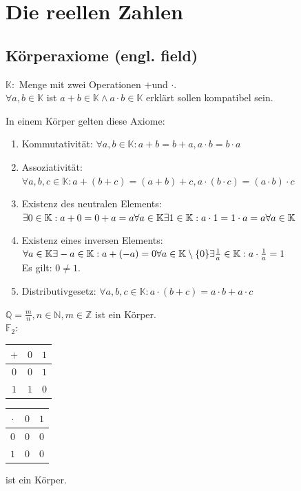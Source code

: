 \documentclass[../ana1.tex]{subfiles}
\begin{document}
\section{Die reellen Zahlen}
\subsection{Körperaxiome (engl. field)}
$\mathbb{K:}$ Menge mit zwei Operationen \glqq $+$\grqq und \glqq $\cdot$\grqq.\\
$\forall a,b \in \mathbb{K}$ ist $a+b\in \mathbb{K} \wedge a\cdot b \in \mathbb{K}$ erklärt sollen kompatibel sein.
\begin{defi}[Körperaxiome]
	In einem Körper gelten diese Axiome:
	\begin{enumerate}
		\item Kommutativität: $\forall a,b\in \mathbb{K}: a+b=b+a, a\cdot b=b\cdot a$
		\item Assoziativität: $\forall a,b,c\in \mathbb{K}: a+(b+c) = (a+b)+c, a\cdot (b\cdot c) = (a\cdot b)\cdot c$
		\item Existenz des neutralen Elements: \\
		      $\exists 0 \in \mathbb{K}: a + 0 = 0 + a = a \forall a\in \mathbb{K}\\
			      \exists 1 \in \mathbb{K}: a \cdot 1 = 1 \cdot a = a \forall a\in\mathbb{K}$
		\item Existenz eines inversen Elements:\\
		      $\forall a\in\mathbb{K}\exists -a\in\mathbb{K}:a+ (-a)=0\\
			      \forall a\in\mathbb{K}\setminus\{0\}\exists \frac{1}{a}\in\mathbb{K}:a\cdot\frac{1}{a}=1$\\
		      Es gilt: $0 \neq 1$.
		\item Distributivgesetz: $\forall a,b,c\in\mathbb{K}:a\cdot(b+c)=a\cdot b + a \cdot c$
	\end{enumerate}
\end{defi}
\begin{bsp}
	$\mathbb{Q} = \frac{m}{n}, n \in \mathbb{N}, m\in\mathbb{Z}$ ist ein Körper.\\
	$\mathbb{F}_2: $
	\begin{tabular}{c|cc}
		$+$ & $0$ & $1$ \\
		\hline
		$0$ & $0$ & $1$ \\
		$1$ & $1$ & $0$
	\end{tabular}
	\begin{tabular}{c|cc}
		$\cdot$ & $0$ & $1$ \\
		\hline
		$0$     & $0$ & $0$ \\
		$1$     & $0$ & $0$
	\end{tabular}
	ist ein Körper.
\end{bsp}
\end{document}
